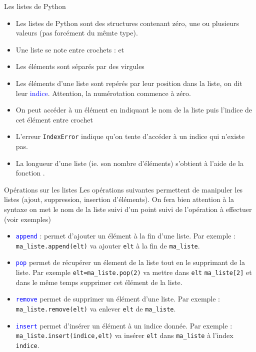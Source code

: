 \documentclass[10pt]{beamer}
\begin{document}
\begin{frame}[fragile]{\Ctitle}{\stitle}
	\begin{center}
		\begin{alertblock}{Les listes de Python}
			\begin{itemize}
				\item<1-> Les listes de Python sont des structures contenant  zéro, une ou plusieurs valeurs (pas forcément du mêmte type).
				\item<2-> Une liste se note entre crochets : \kw{[} et \kw{]}
				\item<3-> Les éléments sont séparés par des virgules
				\item<4-> Les éléments d'une liste sont repérés par leur position dans la liste, on dit leur \textcolor{blue}{indice}. Attention, la numérotation commence à zéro.
				\item<6-> On peut accéder à un élément en indiquant le nom de la liste puis  l'indice de cet élément entre crochet
				\item<7-> L'erreur {\tt IndexError} indique qu'on tente d'accéder à un indice qui n'existe pas.
				\item<8-> La longueur d'une liste (ie. son nombre d'éléments) s'obtient à l'aide de la fonction .
			\end{itemize}
		\end{alertblock}
	\end{center}
\end{frame}

\begin{frame}[fragile]{\Ctitle}{\stitle}
	\begin{alertblock}{Opérations sur les listes}
		Les opérations suivantes permettent de manipuler les listes (ajout, suppression, insertion d'éléments). On fera bien attention à la syntaxe on met le nom de la liste suivi d'un point suivi de l'opération à effectuer (voir exemples)
		\begin{itemize}
			\item<1-> \textcolor{blue}{\tt append} : permet d'ajouter un élément à la fin d'une liste. Par exemple : {\tt ma\_liste.append(elt)} va ajouter {\tt elt} à la fin de {\tt ma\_liste}.
			\item<2-> \textcolor{blue}{\tt pop} permet de récupérer un élement de la liste tout en le supprimant de la liste. Par exemple {\tt elt=ma\_liste.pop(2)} va mettre dans {\tt elt} {\tt ma\_liste[2]} et dans le même temps supprimer cet élément de la liste.
			\item<3-> \textcolor{blue}{\tt remove} permet de supprimer un élément d'une liste. Par exemple : {\tt ma\_liste.remove(elt)} va enlever {\tt elt} de {\tt ma\_liste}.
			\item<4-> \textcolor{blue}{\tt insert} permet d'insérer un élément à un indice donnée. Par exemple : {\tt ma\_liste.insert(indice,elt)} va insérer {\tt elt} dans {\tt ma\_liste} à l'index {\tt indice}.
		\end{itemize}
	\end{alertblock}
\end{frame}
\end{document}
